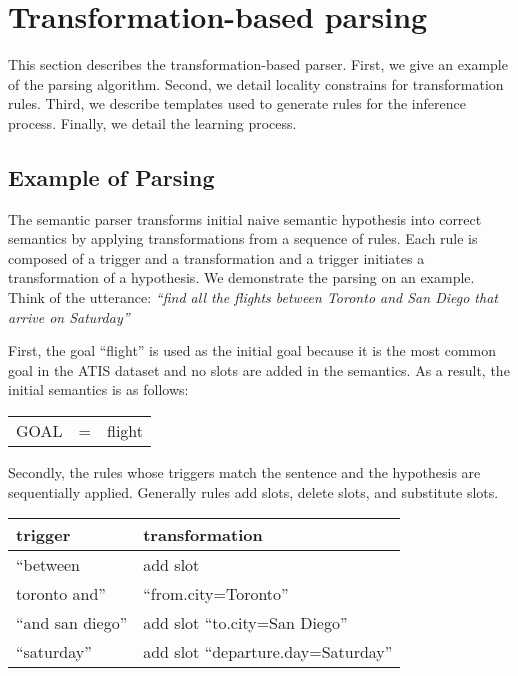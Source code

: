 \documentclass{article}
\begin{document}
\section{Transformation-based parsing} \label{sec:tbl}
This section describes the transformation-based parser. 
First, we give an example of the parsing algorithm. 
Second, we detail locality constrains for transformation rules.
Third, we describe templates used to generate rules for the inference process. 
Finally, we detail the learning process. 

\subsection{Example of Parsing} \label{sec:tbl:example}
The semantic parser transforms initial naive semantic hypothesis into correct semantics by applying transformations from a sequence of rules. Each rule is composed of a trigger and a transformation and a trigger initiates a transformation of a hypothesis.
We demonstrate the parsing on an example. Think of the utterance: \textit{``find all the flights between Toronto and San Diego that arrive on Saturday''} 

First, the goal ``flight'' is used as the initial goal because it is the most common goal in the ATIS dataset and no slots are added in the semantics. As a result, the initial semantics is as follows:

\vspace{.15cm}
\begin{tabular}{lll}
  GOAL & = & flight
\end{tabular} 
\vspace{.15cm}

Secondly, the rules whose triggers match the sentence and the hypothesis are sequentially applied. Generally rules add slots, delete slots, and substitute slots. 

\vspace{.15cm}
\begin{tabular}{ll}
  trigger & transformation \\
  \hline 
  ``between               & add slot \\
    toronto and''         &``from.city=Toronto'' \\
  ``and san diego''       & add slot ``to.city=San Diego'' \\
  ``saturday''            & add slot ``departure.day=Saturday'' \\
\end{tabular} 
\vspace{.15cm}
\end{document}

